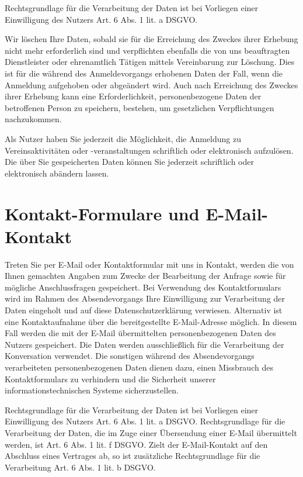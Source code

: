 \documentclass[
  fontsize=12pt,
  paper=a4,
  DIV14,
  parskip,
]{scrartcl}
\begin{document}
Rechtsgrundlage für die Verarbeitung der Daten ist bei Vorliegen einer
Einwilligung des Nutzers Art. 6 Abs. 1 lit. a DSGVO.

Wir löschen Ihre Daten, sobald sie für die Erreichung des Zweckes ihrer
Erhebung nicht mehr erforderlich sind und verpflichten ebenfalls die von uns
beauftragten Dienstleister oder ehrenamtlich Tätigen mittels Vereinbarung zur
Löschung.
Dies ist für die während des Anmeldevorgangs erhobenen Daten der Fall, wenn
die Anmeldung aufgehoben oder abgeändert wird. Auch nach Erreichung des
Zweckes ihrer Erhebung kann eine Erforderlichkeit, personenbezogene Daten der
betroffenen Person zu speichern, bestehen, um gesetzlichen Verpflichtungen
nachzukommen.

Als Nutzer haben Sie jederzeit die Möglichkeit, die Anmeldung zu
Vereinsaktivitäten oder -veranstaltungen schriftlich oder elektronisch
aufzulösen. Die über Sie gespeicherten Daten können Sie jederzeit schriftlich
oder elektronisch abändern lassen.

\section{Kontakt-Formulare und E-Mail-Kontakt}

Treten Sie per E-Mail oder Kontaktformular mit uns in Kontakt, werden die von
Ihnen gemachten Angaben zum Zwecke der Bearbeitung der Anfrage sowie für
mögliche Anschlussfragen gespeichert.
Bei Verwendung des Kontaktformulars wird im Rahmen des Absendevorgangs Ihre
Einwilligung zur Verarbeitung der Daten eingeholt und auf diese
Datenschutzerklärung verwiesen.
Alternativ ist eine Kontaktaufnahme über die bereitgestellte E-Mail-Adresse
möglich. In diesem Fall werden die mit der E-Mail übermittelten
personenbezogenen Daten des Nutzers gespeichert.
Die Daten werden ausschließlich für die Verarbeitung der Konversation
verwendet.
Die sonstigen während des Absendevorgangs verarbeiteten personenbezogenen
Daten dienen dazu, einen Missbrauch des Kontaktformulars zu verhindern und
die Sicherheit unserer informationstechnischen Systeme sicherzustellen.

Rechtsgrundlage für die Verarbeitung der Daten ist bei Vorliegen einer
Einwilligung des Nutzers Art. 6 Abs. 1 lit. a DSGVO. Rechtsgrundlage für die
Verarbeitung der Daten, die im Zuge einer Übersendung einer E-Mail
übermittelt werden, ist Art. 6 Abs. 1 lit. f DSGVO.
Zielt der E-Mail-Kontakt auf den Abschluss eines Vertrages ab, so ist
zusätzliche Rechtsgrundlage für die Verarbeitung Art. 6 Abs. 1 lit. b DSGVO.
\end{document}
